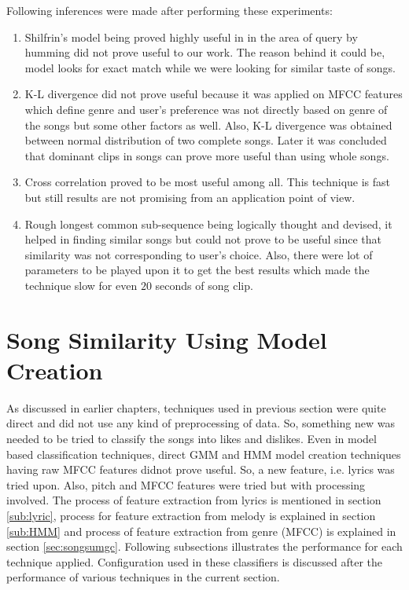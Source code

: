 \par Following inferences were made after performing these experiments:
\begin{enumerate}
\item Shilfrin's model being proved highly useful in in the area of query by humming did not prove useful to our work. The reason behind it could be, model looks for exact match while we were looking for similar taste of songs.
\item K-L divergence did not prove useful because it was applied on MFCC features which define genre and user's preference was not directly based on genre of the songs but some other factors as well. Also, K-L divergence was obtained between normal distribution of two complete songs. Later it was concluded that dominant clips in songs can prove more useful than using whole songs.
\item Cross correlation proved to be most useful among all. This technique is fast but still results are not promising from an application point of view.
\item Rough longest common sub-sequence being logically thought and devised, it helped in finding similar songs but could not prove to be useful since that similarity was not corresponding to user's choice. Also, there were lot of parameters to be played upon it to get the best results which made the technique slow for even $20$ seconds of song clip.
\end{enumerate}

\section{Song Similarity Using Model Creation}
As discussed in earlier chapters, techniques used in previous section were quite direct and did not use any kind of preprocessing of data. So, something new was needed to be tried to classify the songs into likes and dislikes. Even in model based classification techniques, direct GMM and HMM model creation techniques having raw MFCC features didnot prove useful. So, a new feature, i.e. lyrics was tried upon. Also, pitch and MFCC features were tried but with processing involved. The process of feature extraction from lyrics is mentioned in section \ref{sub:lyric}, process for feature extraction from melody is explained in section \ref{sub:HMM} and process of feature extraction from genre (MFCC) is explained in section \ref{sec:songsumgc}. Following subsections illustrates the performance for each technique applied. Configuration used in these classifiers is discussed after the performance of various techniques in the current section.
